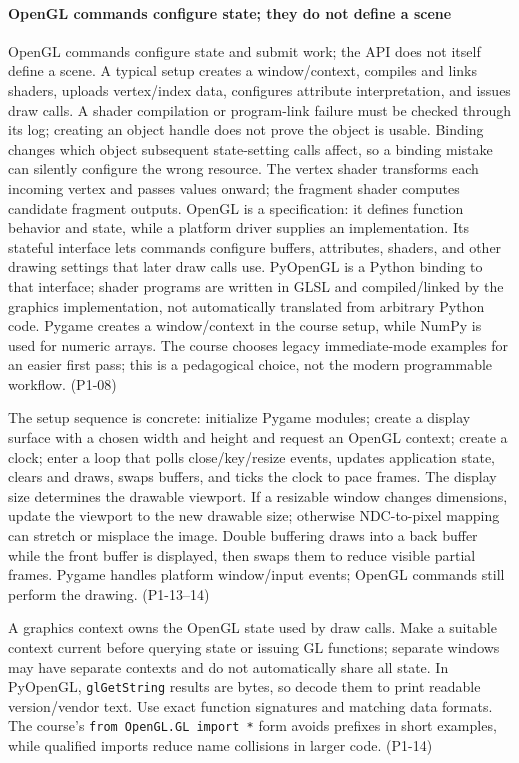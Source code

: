 \paragraph{OpenGL commands configure state; they do not define a scene}\label{opengl-commands-configure-state-they-do-not-define-a-scene}

OpenGL commands configure state and submit work; the API does not itself define a scene. A typical setup creates a window/context, compiles and links shaders, uploads vertex/index data, configures attribute interpretation, and issues draw calls. A shader compilation or program-link failure must be checked through its log; creating an object handle does not prove the object is usable. Binding changes which object subsequent state-setting calls affect, so a binding mistake can silently configure the wrong resource. The vertex shader transforms each incoming vertex and passes values onward; the fragment shader computes candidate fragment outputs. OpenGL is a specification: it defines function behavior and state, while a platform driver supplies an implementation. Its stateful interface lets commands configure buffers, attributes, shaders, and other drawing settings that later draw calls use. PyOpenGL is a Python binding to that interface; shader programs are written in GLSL and compiled/linked by the graphics implementation, not automatically translated from arbitrary Python code. Pygame creates a window/context in the course setup, while NumPy is used for numeric arrays. The course chooses legacy immediate-mode examples for an easier first pass; this is a pedagogical choice, not the modern programmable workflow. (P1-08)

The setup sequence is concrete: initialize Pygame modules; create a display surface with a chosen width and height and request an OpenGL context; create a clock; enter a loop that polls close/key/resize events, updates application state, clears and draws, swaps buffers, and ticks the clock to pace frames. The display size determines the drawable viewport. If a resizable window changes dimensions, update the viewport to the new drawable size; otherwise NDC-to-pixel mapping can stretch or misplace the image. Double buffering draws into a back buffer while the front buffer is displayed, then swaps them to reduce visible partial frames. Pygame handles platform window/input events; OpenGL commands still perform the drawing. (P1-13--14)

A graphics context owns the OpenGL state used by draw calls. Make a suitable context current before querying state or issuing GL functions; separate windows may have separate contexts and do not automatically share all state. In PyOpenGL, \texttt{glGetString} results are bytes, so decode them to print readable version/vendor text. Use exact function signatures and matching data formats. The course's \texttt{from\ OpenGL.GL\ import\ *} form avoids prefixes in short examples, while qualified imports reduce name collisions in larger code. (P1-14)


